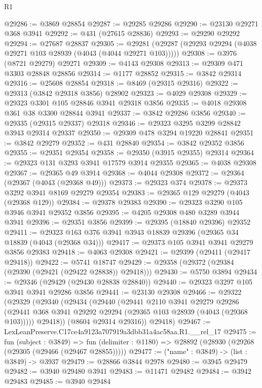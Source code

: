 \begin{lexlean}{R1}
\begin{coremodule}
@29286 := @3869 @28854
@29287 := @29285 @29286
@29290 := @23130 @29271 @368 @3941
@29292 := @431 (@27615 @28836)
@29293 := @29290 @29292
@29294 := @27687 @28837
@29305 := @29281 (@29287 (@29293 @29294 (@4038 @29271 @103 @28939 (@4043 (@4044 @29271 @103)))))
@29308 := @3976 (@8721 @29279) @29271
@29309 := @4143 @29308
@29313 := @29309 @471 @3303 @28848 @28856
@29314 := @1177 @28852
@29315 := @3842 @29314
@29316 := @25608 @28854
@29318 := @8469 (@29315 @29316)
@29322 := @29313 (@3842 @29318 @3856) @28902
@29323 := @4029 @29308
@29329 := @29323 @3301 @105 @28846 @3941 @29318 @3856
@29335 := @4018 @29308 @361 @38 @3300 @28844 @3941
@29337 := @3842 @29286 @3856
@29340 := @29335 (@29315 @29337) @29318
@29346 := @29323 @3295 @3299 @28842 @3943 @29314 @29337
@29350 := @29309 @478 @3294 @19220 @28841
@29351 := @3842 @29279
@29352 := @431 @28840
@29354 := @3842 @29352 @3856
@29355 := @29351 @29354
@29358 := @29350 (@3915 @29355) @29314
@29364 := @29323 @131 @3293 @3941 @17579 @3914 @29355
@29365 := @4038 @29308
@29367 := @29365 @49 @3914
@29368 := @4044 @29308
@29372 := @29364 (@29367 (@4043 (@29368 @49)))
@29373 := @29323 @374
@29378 := @29373 @3292 @3941 @8169 @29279 @29354
@29383 := @29365 @129 @29279 (@4043 (@29368 @129))
@29384 := @29378 @29383
@29390 := @29323 @3290 @105 @3946 @3941 @29352 @3856
@29395 := @4205 @29308 @480 @3289 @3944 @3941
@29396 := @29351 @3856
@29399 := @29395 (@18840 @29396) @29352
@29411 := @29323 @163 @376 @3941 @3943 @18839 @29396 (@29365 @34 @18839 (@4043 (@29368 @34)))
@29417 := @29373 @105 @3941 @3941 @29279 @3856 @29383
@29418 := @4063 @29308
@29421 := @29399 (@29411 (@29417 @29418))
@29422 := @5741 @18747
@29429 := @29358 (@29372 (@29384 (@29390 (@29421 (@29422 @28838)) @29418)))
@29430 := @5750 @3894
@29434 := @29346 (@29429 (@29430 @28838 @28840))
@29440 := @29323 @3297 @105 @3941 @3941 @29286 @3856
@29441 := @23130 @29308
@29466 := @29322
    (@29329
      (@29340
        (@29434
          (@29440
            (@29441
              @2110
              @3941
              @29279
              @29286
              (@29441 @368 @3941 @29292 @29294 (@29365 @103 @28939 (@4043 (@29368 @103)))))
            @29418))
        (@8604 @29314 @29316))
      @29418)
@29467 := LexLeanPreserve.C17ce4a9123a707919a3dbb31a4ac58aa.R1.__rel_17
@29475 := fun (subject : @3849) =>
  fun (delimiter : @1180) => @28892 (@28930 (@29268 (@29305 (@29466 (@29467 @28855)))))
@29477 := ("name" : @3849) -> (list : @3849) -> @3937
@29479 := @28866 @3844 @2978
@29480 := @3945 @29479
@29482 := @3940 @29480 @3941
@29483 := @11471 @29482
@29484 := @3942 @29483
@29485 := @3940 @29484

\end{coremodule}
\end{lexlean}

